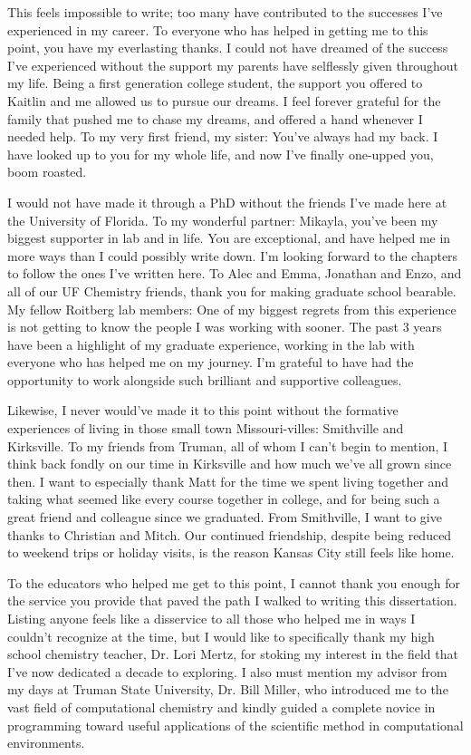 This feels impossible to write; too many have contributed to the successes I've experienced in my career. 
To everyone who has helped in getting me to this point, you have my everlasting thanks. 
I could not have dreamed of the success I've experienced without the support my parents have selflessly given throughout my life. 
Being a first generation college student, the support you offered to Kaitlin and me allowed us to pursue our dreams. 
I feel forever grateful for the family that pushed me to chase my dreams, and offered a hand whenever I needed help.
To my very first friend, my sister: You've always had my back. I have looked up to you for my whole life, and now I've finally one-upped you, boom roasted.

I would not have made it through a PhD without the friends I've made here at the University of Florida. 
To my wonderful partner: Mikayla, you've been my biggest supporter in lab and in life. 
You are exceptional, and have helped me in more ways than I could possibly write down. 
I'm looking forward to the chapters to follow the ones I've written here. 
To Alec and Emma, Jonathan and Enzo, and all of our UF Chemistry friends, thank you for making graduate school bearable.
My fellow Roitberg lab members: One of my biggest regrets from this experience is not getting to know the people I was working with sooner. 
The past 3 years have been a highlight of my graduate experience, working in the lab with everyone who has helped me on my journey.
I'm grateful to have had the opportunity to work alongside such brilliant and supportive colleagues.

Likewise, I never would've made it to this point without the formative experiences of living in those small town Missouri-villes: Smithville and Kirksville. 
To my friends from Truman, all of whom I can't begin to mention, I think back fondly on our time in Kirksville and how much we've all grown since then. 
I want to especially thank Matt for the time we spent living together and taking what seemed like every course together in college, and for being such a great friend and colleague since we graduated.
From Smithville, I want to give thanks to Christian and Mitch.
Our continued friendship, despite being reduced to weekend trips or holiday visits, is the reason Kansas City still feels like home.

To the educators who helped me get to this point, I cannot thank you enough for the service you provide that paved the path I walked to writing this dissertation. 
Listing anyone feels like a disservice to all those who helped me in ways I couldn't recognize at the time, but I would like to specifically thank my high school chemistry teacher, Dr. Lori Mertz, for stoking my interest in the field that I've now dedicated a decade to exploring. 
I also must mention my advisor from my days at Truman State University, Dr. Bill Miller, who introduced me to the vast field of computational chemistry and kindly guided a complete novice in programming toward useful applications of the scientific method in computational environments.

